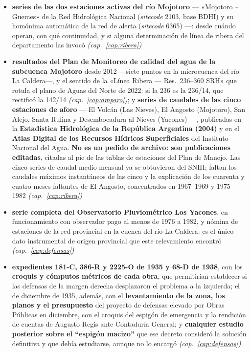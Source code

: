 \begin{itemize}[leftmargin=*]
\item \textbf{series de las dos estaciones activas del río Mojotoro} --- «Mojotoro -- Güemes» de la Red Hidrológica Nacional (\textit{sitecode} 2103, base BDHI) y su homónima automática de la red de alerta (\textit{sitecode} 6365) ---: desde cuándo operan, con qué continuidad, y si alguna determinación de línea de ribera del departamento las invocó \textit{(cap.\ \ref{cap:ribera})}
\item \textbf{resultados del Plan de Monitoreo de calidad del agua de la subcuenca Mojotoro} desde 2012 ---siete puntos en la microcuenca del río La Caldera---, y el sentido de la «Línea Ribera --- Res.\ 236--360 SRH» que rotula el plano de Aguas del Norte de 2022: si la 236 es la 236/14, que rectificó la 142/14 \textit{(cap.\ \ref{cap:amparo})}; y \textbf{series de caudales de las cinco estaciones de aforo} --- El Volcán (Las Nieves), El Angosto (Mojotoro), San Alejo, Santa Rufina y Desembocadura al Nieves (Yacones) ---, publicadas en la \textbf{Estadística Hidrológica de la República Argentina (2004)} y en el \textbf{Atlas Digital de los Recursos Hídricos Superficiales} del Instituto Nacional del Agua. \textbf{No es un pedido de archivo: son publicaciones editadas}, citadas al pie de las tablas de estaciones del Plan de Manejo. Las cinco series de caudal medio mensual ya se obtuvieron del SNIH; faltan los caudales máximos instantáneos de las cinco y la explicación de los cuarenta y cuatro meses faltantes de El Angosto, concentrados en 1967--1969 y 1975--1982 \textit{(cap.\ \ref{cap:ribera})}
\item \textbf{serie completa del Observatorio Pluviométrico Los Yacones}, en funcionamiento con observador pago al menos de 1976 a 1982, y nómina de estaciones de la red provincial en la cuenca del río La Caldera: es el único dato instrumental de origen provincial que este relevamiento encontró \textit{(cap.\ \ref{cap:defensas})}
\item \textbf{expedientes 181-C, 386-R y 2225-O de 1935 y 68-D de 1938}, con los \textbf{croquis y cómputos métricos de cada obra}, que permitirían establecer si las defensas de la margen derecha desplazaron el problema a la izquierda; el de diciembre de 1935, además, con el \textbf{levantamiento de la zona, los planos y el presupuesto} del proyecto de defensas elevado por Obras Públicas en diciembre, con el croquis del espigón de emergencia y la rendición de cuentas de Augusto Regis ante Contaduría General; y \textbf{cualquier estudio posterior sobre el ``espigón macizo''} que ese decreto consideró la solución definitiva y que debía estudiarse, aunque no lo encargó \textit{(cap.\ \ref{cap:defensas})}

\end{itemize}
